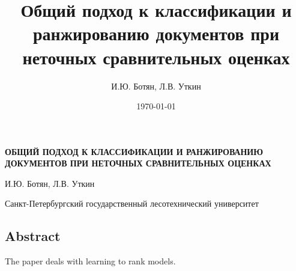 \documentclass[12pt,a4paper,oneside]{article}
\title{Общий подход к классификации и ранжированию документов при неточных сравнительных оценках}
\author{И.Ю. Ботян, Л.В. Уткин}
\date{\today}
\begin{document}



\begin{center}
\textbf{ОБЩИЙ ПОДХОД К КЛАССИФИКАЦИИ И РАНЖИРОВАНИЮ ДОКУМЕНТОВ ПРИ НЕТОЧНЫХ СРАВНИТЕЛЬНЫХ ОЦЕНКАХ}

\vspace*{1em}

И.Ю. Ботян, Л.В. Уткин

\vspace*{1em}

Санкт-Петербургский государственный лесотехнический университет
\end{center}


\begin{footnotesize}
\chapter{Abstract} \nolinebreak
The paper deals with learning to rank models. 
\end{footnotesize}

\end{document}
